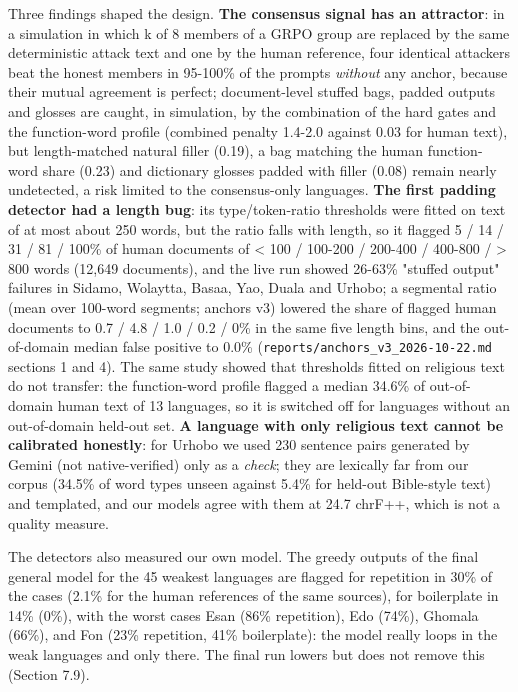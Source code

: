 Three findings shaped the design. \textbf{The consensus signal has an attractor}: in a simulation in which k of 8 members of a GRPO group are replaced by the same deterministic attack text and one by the human reference, four identical attackers beat the honest members in 95-100\% of the prompts \emph{without} any anchor, because their mutual agreement is perfect; document-level stuffed bags, padded outputs and glosses are caught, in simulation, by the combination of the hard gates and the function-word profile (combined penalty 1.4-2.0 against 0.03 for human text), but length-matched natural filler (0.19), a bag matching the human function-word share (0.23) and dictionary glosses padded with filler (0.08) remain nearly undetected, a risk limited to the consensus-only languages. \textbf{The first padding detector had a length bug}: its type/token-ratio thresholds were fitted on text of at most about 250 words, but the ratio falls with length, so it flagged 5 / 14 / 31 / 81 / 100\% of human documents of \textless{} 100 / 100-200 / 200-400 / 400-800 / \textgreater{} 800 words (12,649 documents), and the live run showed 26-63\% "stuffed output" failures in Sidamo, Wolaytta, Basaa, Yao, Duala and Urhobo; a segmental ratio (mean over 100-word segments; anchors v3) lowered the share of flagged human documents to 0.7 / 4.8 / 1.0 / 0.2 / 0\% in the same five length bins, and the out-of-domain median false positive to 0.0\% (\texttt{reports/anchors\_v3\_2026-10-22.md} sections 1 and 4). The same study showed that thresholds fitted on religious text do not transfer: the function-word profile flagged a median 34.6\% of out-of-domain human text of 13 languages, so it is switched off for languages without an out-of-domain held-out set. \textbf{A language with only religious text cannot be calibrated honestly}: for Urhobo we used 230 sentence pairs generated by Gemini (not native-verified) only as a \emph{check}; they are lexically far from our corpus (34.5\% of word types unseen against 5.4\% for held-out Bible-style text) and templated, and our models agree with them at 24.7 chrF++, which is not a quality measure.

The detectors also measured our own model. The greedy outputs of the final general model for the 45 weakest languages are flagged for repetition in 30\% of the cases (2.1\% for the human references of the same sources), for boilerplate in 14\% (0\%), with the worst cases Esan (86\% repetition), Edo (74\%), Ghomala (66\%), and Fon (23\% repetition, 41\% boilerplate): the model really loops in the weak languages and only there. The final run lowers but does not remove this (Section 7.9).

